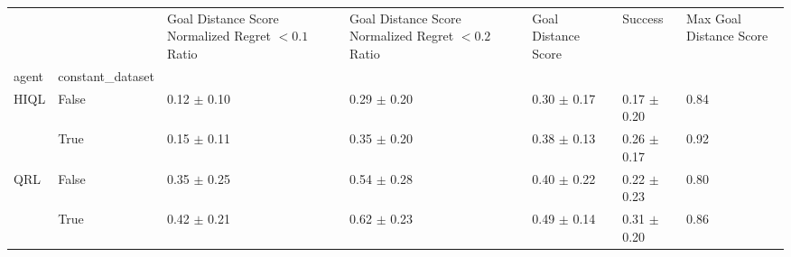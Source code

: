 \begin{tabular}{lllllll}
\toprule
 &  & Goal Distance Score Normalized Regret $< 0.1$ Ratio & Goal Distance Score Normalized Regret $< 0.2$ Ratio & Goal Distance Score & Success & Max Goal Distance Score \\
agent & constant_dataset &  &  &  &  &  \\
\midrule
\multirow[t]{2}{*}{HIQL} & False & 0.12 $\pm$ 0.10 & 0.29 $\pm$ 0.20 & 0.30 $\pm$ 0.17 & 0.17 $\pm$ 0.20 & 0.84 \\
 & True & 0.15 $\pm$ 0.11 & 0.35 $\pm$ 0.20 & 0.38 $\pm$ 0.13 & 0.26 $\pm$ 0.17 & 0.92 \\
\cline{1-7}
\multirow[t]{2}{*}{QRL} & False & 0.35 $\pm$ 0.25 & 0.54 $\pm$ 0.28 & 0.40 $\pm$ 0.22 & 0.22 $\pm$ 0.23 & 0.80 \\
 & True & 0.42 $\pm$ 0.21 & 0.62 $\pm$ 0.23 & 0.49 $\pm$ 0.14 & 0.31 $\pm$ 0.20 & 0.86 \\
\cline{1-7}
\bottomrule
\end{tabular}
